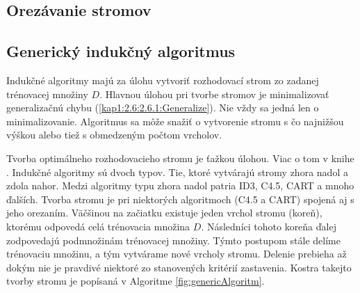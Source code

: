 \subsection{Orezávanie stromov}\label{kap1:2.7:2.7.1:Pruning}

\subsection{Generický indukčný algoritmus}\label{kap1:2.7:2.7.2:Generic}
Indukčné algoritmy majú za úlohu vytvoriť rozhodovací strom zo zadanej trénovacej množiny $D$. Hlavnou úlohou pri tvorbe stromov je minimalizovať generalizačnú chybu (\ref{kap1:2.6:2.6.1:Generalize}). Nie vždy sa jedná len o minimalizovanie. Algoritmus sa môže snažiť o vytvorenie stromu s čo najnižšou výškou alebo tiež s obmedzeným počtom vrcholov.

Tvorba optimálneho rozhodovacieho stromu je ťažkou úlohou. Viac o tom v knihe \cite[s.51]{kap1-DataMiningForTrees}. Indukčné algoritmy sú dvoch typov. Tie, ktoré vytvárajú stromy zhora nadol a zdola nahor. Medzi algoritmy typu zhora nadol patria ID3, C4.5, CART a mnoho ďalších. Tvorba stromu je pri niektorých algoritmoch (C4.5 a CART) spojená aj s jeho orezaním. Väčšinou na začiatku existuje jeden vrchol stromu (koreň), ktorému odpovedá celá trénovacia množina $D$. Následníci tohoto koreňa ďalej zodpovedajú podmnožinám trénovacej množiny. Týmto postupom stále delíme trénovaciu množinu, a tým vytvárame nové vrcholy stromu. Delenie prebieha až dokým nie je pravdivé niektoré zo stanovených kritérií zastavenia. Kostra takejto tvorby stromu je popísaná v Algoritme  \ref{fig:genericAlgoritm}.

